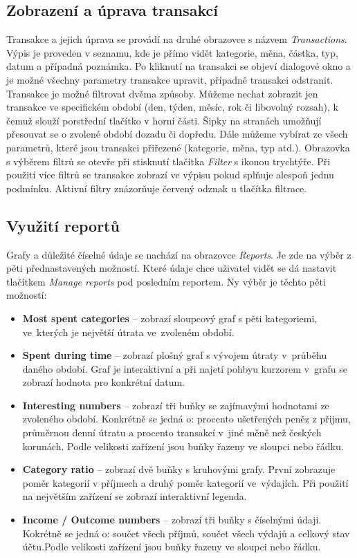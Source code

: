 \documentclass[
  biblatex,
  figures=true,
  tables=false,
  glossaries,
  index
]{kidiplom}
\begin{document}
\subsection{Zobrazení a úprava transakcí}
Transakce a jejich úprava se provádí na druhé obrazovce s názvem \textit{Transactions}. Výpis je proveden v seznamu, kde je přímo vidět kategorie, měna, částka, typ, datum a případná poznámka. Po kliknutí na transakci se objeví dialogové okno a je možné všechny parametry transakce upravit, případně transakci odstranit. Transakce je možné filtrovat dvěma způsoby. Můžeme nechat zobrazit jen transakce ve specifickém období (den, týden, měsíc, rok či libovolný rozsah), k čemuž slouží porstřední tlačítko v horní části. Šipky na stranách umožňují přesouvat se o zvolené období dozadu či dopředu. Dále můžeme vybírat ze všech parametrů, které jsou transakci přiřezené (kategorie, měna, typ atd.). Obrazovka s výběrem filtrů se otevře při stisknutí tlačítka \textit{Filter} s ikonou trychtýře. Při použití více filtrů se transakce zobrazí ve výpisu pokud splňuje alespoň jednu podmínku. Aktivní filtry znázorňuje červený odznak u tlačítka filtrace.

\subsection{Využití reportů}
Grafy a důležité číselné údaje se nachází na obrazovce \textit{Reports}. Je zde na výběr z pěti přednastavených možností. Které údaje chce uživatel vidět se dá nastavit tlačítkem \textit{Manage reports} pod posledním reportem. Ny výběr je těchto pěti možností:
\begin{itemize}
  \item \textbf{Most spent categories} -- zobrazí sloupcový graf s pěti kategoriemi, ve~kterých je největší útrata ve~zvoleném období.
  \item \textbf{Spent during time} -- zobrazí plošný graf s vývojem útraty v~průběhu daného období. Graf je interaktivní a při najetí pohbyu kurzorem v~grafu se zobrazí hodnota pro konkrétní datum.
  \item \textbf{Interesting numbers} -- zobrazí tři buňky se zajímavými hodnotami ze zvoleného období. Konkrétně se jedná o: procento ušetřených peněz z přijmu, průměrnou denní útratu a procento transakcí v~jiné měně než českých korunách. Podle velikosti zařízení jsou buňky řazeny ve sloupci nebo řádku.
  \item \textbf{Category ratio} -- zobrazí dvě buňky s kruhovými grafy. První zobrazuje poměr kategorií v příjmech a druhý poměr kategorií ve~výdajích. Při použití na největším zařízení se zobrazí interaktivní legenda.
  \item \textbf{Income / Outcome numbers} -- zobrazí tři buňky s číselnými údaji. Kokrétně se jedná o: součet všech příjmů, součet všech výdajů a celkový stav účtu.Podle velikosti zařízení jsou buňky řazeny ve sloupci nebo řádku.
\end{itemize}
\end{document}
